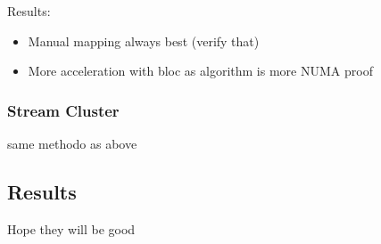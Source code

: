 Results:
\begin{itemize}
    \item Manual mapping always best (verify that)
    \item More acceleration with bloc as algorithm is more NUMA proof
\end{itemize}

\subsubsection{Stream Cluster}
same methodo as above
\subsection{Results}
\label{sec:expe-results}
Hope they will be good


